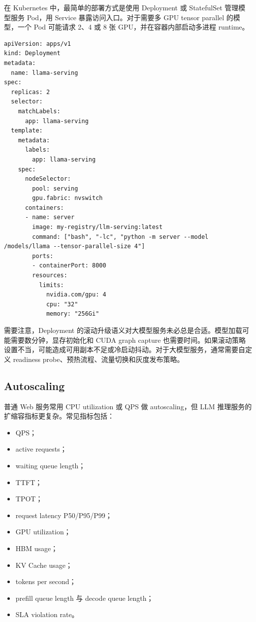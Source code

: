 在 Kubernetes 中，最简单的部署方式是使用 Deployment 或 StatefulSet 管理模型服务 Pod，用 Service 暴露访问入口。对于需要多 GPU tensor parallel 的模型，一个 Pod 可能请求 2、4 或 8 张 GPU，并在容器内部启动多进程 runtime。

\begin{lstlisting}[caption={LLM Model Server Deployment 的概念示例},label={lst:llm-serving-deployment}]
apiVersion: apps/v1
kind: Deployment
metadata:
  name: llama-serving
spec:
  replicas: 2
  selector:
    matchLabels:
      app: llama-serving
  template:
    metadata:
      labels:
        app: llama-serving
    spec:
      nodeSelector:
        pool: serving
        gpu.fabric: nvswitch
      containers:
      - name: server
        image: my-registry/llm-serving:latest
        command: ["bash", "-lc", "python -m server --model /models/llama --tensor-parallel-size 4"]
        ports:
        - containerPort: 8000
        resources:
          limits:
            nvidia.com/gpu: 4
            cpu: "32"
            memory: "256Gi"
\end{lstlisting}

需要注意，Deployment 的滚动升级语义对大模型服务未必总是合适。模型加载可能需要数分钟，显存初始化和 CUDA graph capture 也需要时间。如果滚动策略设置不当，可能造成可用副本不足或冷启动抖动。对于大模型服务，通常需要自定义 readiness probe、预热流程、流量切换和灰度发布策略。

\subsection{Autoscaling}
\label{subsec:autoscaling}

普通 Web 服务常用 CPU utilization 或 QPS 做 autoscaling，但 LLM 推理服务的扩缩容指标更复杂。常见指标包括：

\begin{itemize}
  \item QPS；
  \item active requests；
  \item waiting queue length；
  \item TTFT；
  \item TPOT；
  \item request latency P50/P95/P99；
  \item GPU utilization；
  \item HBM usage；
  \item KV Cache usage；
  \item tokens per second；
  \item prefill queue length 与 decode queue length；
  \item SLA violation rate。
\end{itemize}

